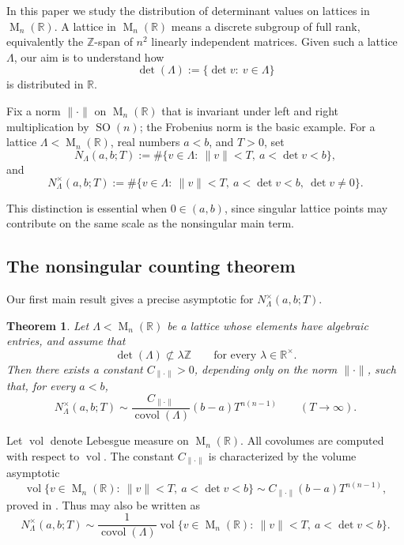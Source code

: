 \documentclass[reqno,11pt]{amsart}
\numberwithin{equation}{section}
\newtheorem{theorem}{Theorem}[section]
\theoremstyle{definition}
\theoremstyle{remark}
\newcommand{\op}{\operatorname}
\newcommand{\SO}{\op{SO}}
\newcommand{\vol}{\op{vol}}
\newcommand{\M}{\op{M}}
\newcommand{\covol}{\op{covol}}
\begin{document}
In this paper we study the distribution of determinant values on lattices in
$\M_n(\mathbb R)$. A
lattice in $\M_n(\mathbb R)$ means a discrete subgroup of full rank,
equivalently the $\mathbb Z$-span of $n^2$ linearly independent
matrices. Given such a lattice $\Lambda$, our aim is to understand how
$$
\det(\Lambda):=\{\det v:\ v\in\Lambda\}
$$ is distributed in $\mathbb R$.



Fix a norm
$\|\cdot\|$ on $\M_n(\mathbb R)$ that is invariant under left and right
multiplication by $\SO(n)$; the Frobenius norm is the basic example. For a
lattice $\Lambda<\M_n(\mathbb R)$, real numbers $a<b$, and $T>0$, set
$$
N_\Lambda(a,b;T)
:=
\#\{v\in\Lambda:\ \|v\|<T,\ a<\det v<b\},
$$
and
$$
N_\Lambda^\times(a,b;T)
:=
\#\{v\in\Lambda:\ \|v\|<T,\ a<\det v<b,\ \det v\ne0\}.
$$

This distinction is essential when $0\in(a,b)$, since singular lattice
points may contribute on the same scale as the nonsingular main term.


\subsection{The nonsingular counting theorem}

Our first main result gives a precise asymptotic for
$N_\Lambda^\times(a,b;T)$.

\begin{theorem}\label{m1} 
Let $\Lambda<\M_n(\mathbb R)$ be a lattice whose elements have
algebraic entries, and assume that
\begin{equation}\label{irr}
\det(\Lambda)\not\subset\lambda\mathbb Z
\qquad
\text{for every }\lambda\in\mathbb R^\times.
\end{equation}
Then there exists a constant $C_{\|\cdot\|}>0$, depending only on the norm $\|\cdot\|$, such that, for every $a<b$,
\begin{equation}\label{eq:intro-regular-asymptotic}
N_\Lambda^\times(a,b;T)
\sim
\frac{C_{\|\cdot\|}}{\covol(\Lambda)}
(b-a)T^{n(n-1)}
\qquad(T\to\infty).
\end{equation}
\end{theorem}

Let $\vol$ denote Lebesgue measure on $\M_n(\mathbb R)$. All covolumes are computed with respect to $\vol$. The constant
$C_{\|\cdot\|}$ is characterized by the volume asymptotic
\begin{equation}\label{eq:intro-volume-asymptotic}
\operatorname{vol}
\{v\in\M_n(\mathbb R):\ \|v\|<T,\ a<\det v<b\}
\sim
C_{\|\cdot\|}(b-a)T^{n(n-1)},
\end{equation}
proved in . Thus  may also be
written as
$$
N_\Lambda^\times(a,b;T)
\sim
\frac{1}{\covol(\Lambda)}
\operatorname{vol}
\{v\in\M_n(\mathbb R):\ \|v\|<T,\ a<\det v<b\}.
$$
\end{document}
